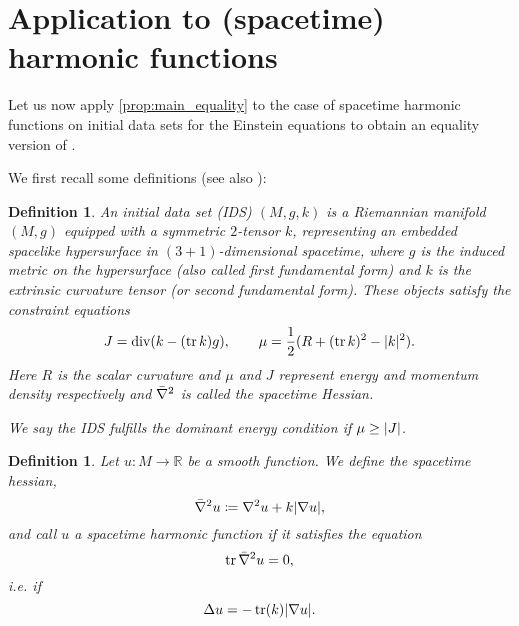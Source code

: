 \documentclass[draft]{amsart}
\newtheorem{definition}[theorem]{Definition}
\newcommand*{\mathcomma}{,}
\newcommand*{\mathfullstop}{.}
\newcommand*{\definedas}{\coloneqq}
\newcommand*{\maps}{\colon}
\newcommand*{\reals}{\mathbb{R}}
\newcommand*{\laplacian}{\Delta}
\DeclareMathOperator{\divergence}{div}
\DeclareMathOperator{\trace}{tr}
\DeclarePairedDelimiter{\abs}{\lvert}{\rvert} %
\begin{document}
\section{Application to (spacetime) harmonic functions}
Let us now apply \cref{prop:main_equality} to the case of spacetime harmonic functions on initial data sets for the Einstein equations to obtain an equality version of \cite[Proposition 4.2]{hirschSpacetimeHarmonicFunctions2021}. 

We first recall some definitions (see also \cite[Definition 7.16]{leeGeometricRelativity2019}):
\begin{definition}\label{def:initial_data_set}
    An \emph{initial data set} (IDS) \( (M,g,k) \) is a Riemannian manifold \( (M,g) \) equipped with a symmetric \( 2 \)-tensor \( k \), representing an embedded spacelike hypersurface in \( (3+1) \)-dimensional spacetime, where \( g \) is the induced metric on the hypersurface (also called first fundamental form) and \( k \) is the extrinsic curvature tensor (or second fundamental form). These objects satisfy the \emph{constraint equations}
    \begin{equation}\label{eq:spacetime_definitions}
        J=\divergence(k-(\trace{k})g), \qquad  \mu=\frac{1}{2}(R+(\trace k)^2-\abs{k}^2)\mathfullstop
    \end{equation}
    Here \( R \) is the scalar curvature and \( \mu \) and \( J \) represent energy and momentum density respectively and \( \bar{\nabla}^2 \) is called the \emph{spacetime Hessian}.

    We say the IDS fulfills the \emph{dominant energy condition} if \( \mu\geq \abs{J} \).
\end{definition}
\begin{definition}
    Let \( u\maps M\to \reals \) be a smooth function. We define the \emph{spacetime hessian},
    \begin{equation*}
        \spacetimehessian u \definedas\nabla^2 u+k\abs{\nabla u}\mathcomma
    \end{equation*}
    and call \( u \) a \emph{spacetime harmonic function} if it satisfies the equation
    \begin{equation*}
        \trace{\spacetimehessian u}=0,
    \end{equation*}
    i.e. if
    \begin{equation*}
        \laplacian u=-\trace(k)\abs{\nabla u}.
    \end{equation*}
\end{definition}
\end{document}
